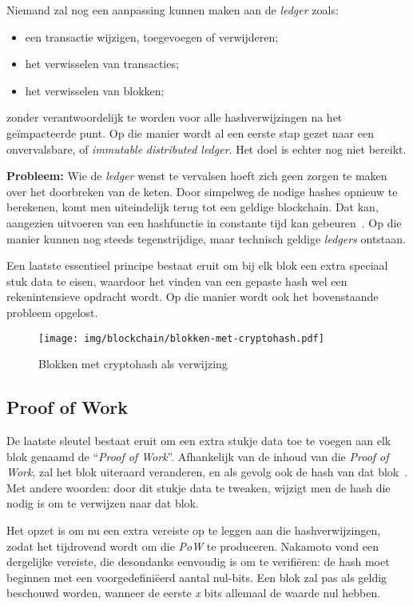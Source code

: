 Niemand zal nog een aanpassing kunnen maken aan de \textit{ledger} zoals:
\begin{itemize}
	\item een transactie wijzigen, toegevoegen of verwijderen;
	\item het verwisselen van transacties;
	\item het verwisselen van blokken;
\end{itemize}

zonder verantwoordelijk te worden voor alle hashverwijzingen na het geïmpacteerde punt. Op die manier wordt al een eerste stap gezet naar een onvervalsbare, of \textit{immutable} \textit{distributed ledger}. Het doel is echter nog niet bereikt.

\textbf{Probleem:} 
Wie de \textit{ledger} wenst te vervalsen hoeft zich geen zorgen te maken over het doorbreken van de keten. 
Door simpelweg de nodige hashes opnieuw te berekenen, komt men uiteindelijk terug tot een geldige blockchain. Dat kan, aangezien uitvoeren van een hashfunctie in constante tijd kan gebeuren~\autocite{Slaats2019}. Op die manier kunnen nog steeds tegenstrijdige, maar technisch geldige \textit{ledgers} ontstaan.

Een laatste essentieel principe bestaat eruit om bij elk blok een extra speciaal stuk data te eisen, waardoor het vinden van een gepaste hash wel een rekenintensieve opdracht wordt. Op die manier wordt ook het bovenstaande probleem opgelost.

\begin{figure}[H]
	\centering
	\texttt{[image: img/blockchain/blokken-met-cryptohash.pdf]}
	\caption{\label{fig:blokken-met-cryptohash}Blokken met cryptohash als verwijzing}
\end{figure}

\subsection{Proof of Work}
\label{sub:proof-of-work}

De laatste sleutel bestaat eruit om een extra stukje data toe te voegen aan elk blok genaamd de ``\textit{Proof of Work}''.
Afhankelijk van de inhoud van die \textit{Proof of Work}, zal het blok uiteraard veranderen, en als gevolg ook de hash van dat blok~\autocite{Nakamoto2008}. Met andere woorden: door dit stukje data te tweaken, wijzigt men de hash die nodig is om te verwijzen naar dat blok.

Het opzet is om nu een extra vereiste op te leggen aan die hashverwijzingen, zodat het tijdrovend wordt om die \textit{PoW} te produceren. Nakamoto vond een dergelijke vereiste, die desondanks eenvoudig is om te verifiëren: de hash moet beginnen met een voorgedefiniëerd aantal nul-bits. Een blok zal pas als geldig beschouwd worden, wanneer de eerste \textit{x} bits allemaal de waarde nul hebben. 

